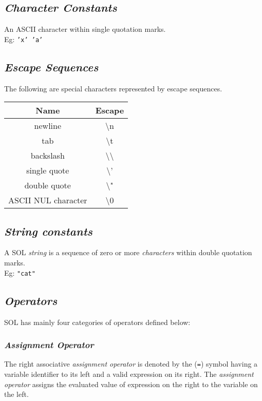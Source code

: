     \subsection{\textit{Character Constants}}
    An ASCII character within single quotation marks.\\
    Eg: \texttt{'x' 'a'}

    \subsection{\textit{Escape Sequences}}
    The following are special characters represented by escape sequences.
        \begin{center}
            \begin{tabular}{ |c|c| }
            \hline
                \textbf{Name}   & \textbf{Escape}\\
                \hline
                newline         & \textbackslash n\\
                tab             & \textbackslash t\\
                backslash       & \textbackslash \textbackslash\\
                single quote    & \textbackslash '\\
                double quote    & \textbackslash "\\
                ASCII NUL character & \textbackslash 0\\
            \hline
            \end{tabular}
        \end{center}

    \subsection{\textit{String constants}}
    A SOL \textit{string} is a sequence of zero or more \textit{characters} within double quotation marks.\\
    Eg: \texttt{"cat"}

    \subsection{\textit{Operators}}
    SOL has mainly four categories of operators defined below:

        \subsubsection{\textit{Assignment Operator}}
        The right associative \textit{assignment operator} is denoted by the (\texttt{=}) symbol having a variable identifier to its left and a valid expression on its right. The \textit{assignment operator} assigns the evaluated value of expression on the right to the variable on the left.

